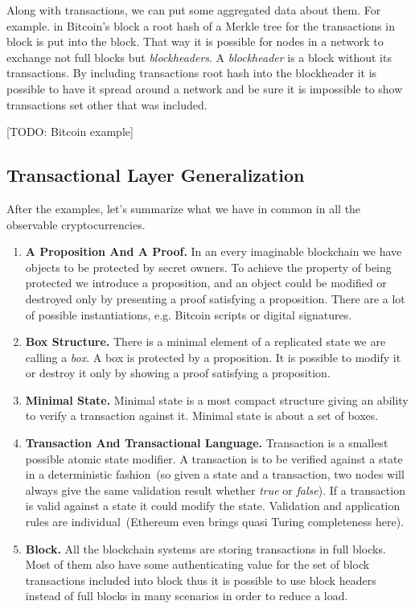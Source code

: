 \documentclass[]{report}   %
\begin{document}
Along with transactions, we can put some aggregated data about them. For example. in Bitcoin's block a root hash of a Merkle tree for the transactions in block is put into the block. That way it is possible for nodes in a network to exchange not full blocks but \textit{blockheaders}. A \textit{blockheader} is a block without its transactions. By including transactions root hash into the blockheader it is possible to have it spread around a network and be sure it is impossible to show transactions set other that was included. 

[TODO: Bitcoin example]

\subsection{Transactional Layer Generalization}

After the examples, let's summarize what we have in common in all the observable cryptocurrencies.

\begin{enumerate}
\item{\textbf{A Proposition And A Proof.}}
In an every imaginable blockchain we have objects to be protected by secret owners. To achieve the property of being protected we introduce a proposition, and an object could be modified or destroyed only by presenting a proof satisfying a proposition. There are a lot of possible instantiations, e.g. Bitcoin scripts or digital signatures. 
\item{\textbf{Box Structure.}}
There is a minimal element of a replicated state we are calling a \textit{box}. A box is protected by a proposition. It is possible to modify it or destroy it only by showing a proof satisfying a proposition. 
\item{\textbf{Minimal State.}}
Minimal state is a most compact structure giving an ability to verify a transaction against it. Minimal state is about a set of boxes. 
\item{\textbf{Transaction And Transactional Language.}}
Transaction is a smallest possible atomic state modifier. A transaction is to be verified against a state in a deterministic fashion~(so given a state and a transaction, two nodes will always give the same validation result whether \textit{true} or \textit{false}). If a transaction is valid against a state it could modify the state. Validation and application rules are individual~(Ethereum even brings quasi Turing completeness here).
\item{\textbf{Block.}}
All the blockchain systems are storing transactions in full blocks. Most of them also have some authenticating value for the set of block transactions included into block thus it is possible to use block headers instead of full blocks in many scenarios in order to reduce a load.
\end{enumerate}
\end{document}

